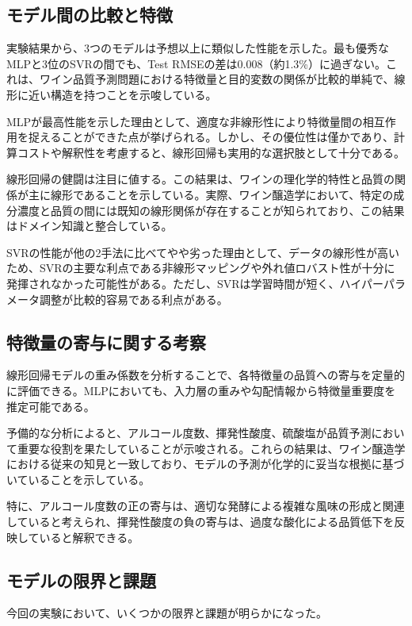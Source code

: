 \documentclass[12pt,a4paper,dvipdfmx]{jsarticle}
\begin{document}
\subsection{モデル間の比較と特徴}

実験結果から、3つのモデルは予想以上に類似した性能を示した。最も優秀なMLPと3位のSVRの間でも、Test RMSEの差は0.008（約1.3\%）に過ぎない。これは、ワイン品質予測問題における特徴量と目的変数の関係が比較的単純で、線形に近い構造を持つことを示唆している。

MLPが最高性能を示した理由として、適度な非線形性により特徴量間の相互作用を捉えることができた点が挙げられる。しかし、その優位性は僅かであり、計算コストや解釈性を考慮すると、線形回帰も実用的な選択肢として十分である。

線形回帰の健闘は注目に値する。この結果は、ワインの理化学的特性と品質の関係が主に線形であることを示している。実際、ワイン醸造学において、特定の成分濃度と品質の間には既知の線形関係が存在することが知られており、この結果はドメイン知識と整合している。

SVRの性能が他の2手法に比べてやや劣った理由として、データの線形性が高いため、SVRの主要な利点である非線形マッピングや外れ値ロバスト性が十分に発揮されなかった可能性がある。ただし、SVRは学習時間が短く、ハイパーパラメータ調整が比較的容易である利点がある。

\subsection{特徴量の寄与に関する考察}

線形回帰モデルの重み係数を分析することで、各特徴量の品質への寄与を定量的に評価できる。MLPにおいても、入力層の重みや勾配情報から特徴量重要度を推定可能である。

予備的な分析によると、アルコール度数、揮発性酸度、硫酸塩が品質予測において重要な役割を果たしていることが示唆される。これらの結果は、ワイン醸造学における従来の知見と一致しており、モデルの予測が化学的に妥当な根拠に基づいていることを示している。

特に、アルコール度数の正の寄与は、適切な発酵による複雑な風味の形成と関連していると考えられ、揮発性酸度の負の寄与は、過度な酸化による品質低下を反映していると解釈できる。

\subsection{モデルの限界と課題}

今回の実験において、いくつかの限界と課題が明らかになった。
\end{document}
